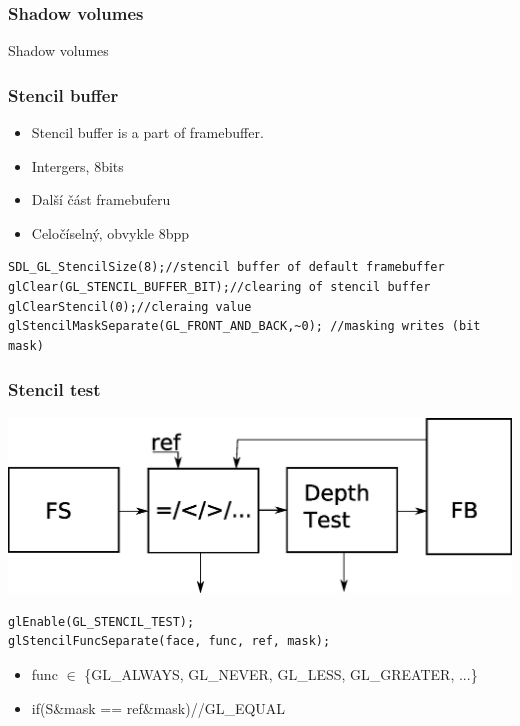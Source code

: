 \begin{frame}
  \frametitle{Shadow volumes}
  \begin{center}
    \Huge {\color{white}Shadow volumes}
  \end{center}
\end{frame}

\begin{frame}[fragile]\frametitle{Stencil buffer}\scriptsize
\begin{itemize}
  \item Stencil buffer is a part of framebuffer.
  \item Intergers, 8bits
\end{itemize}

\begin{itemize}
  \item Další část framebuferu
  \item Celočíselný, obvykle 8bpp
\end{itemize}
\vfill

\begin{verbatim}
SDL_GL_StencilSize(8);//stencil buffer of default framebuffer
glClear(GL_STENCIL_BUFFER_BIT);//clearing of stencil buffer
glClearStencil(0);//cleraing value
glStencilMaskSeparate(GL_FRONT_AND_BACK,~0); //masking writes (bit mask)
\end{verbatim}
\end{frame}

\begin{frame}[fragile]\frametitle{Stencil test}\scriptsize

  \includegraphics[width=\textwidth]{pics/shadows/shadowVolumes/stencil-test.eps}

  \vfill

\begin{verbatim}
glEnable(GL_STENCIL_TEST);
glStencilFuncSeparate(face, func, ref, mask);
\end{verbatim}

  \vfill
  \begin{itemize}
    \item func $\in$ \{GL\_ALWAYS, GL\_NEVER, GL\_LESS, GL\_GREATER, ...\}
    \item if(S\&mask == ref\&mask)//GL\_EQUAL
  \end{itemize}
\end{frame}

